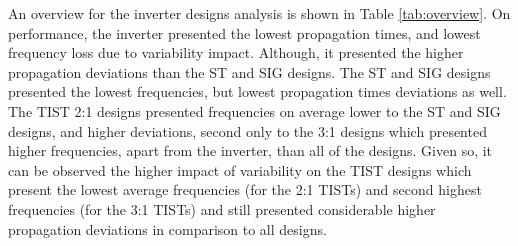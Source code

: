 \documentclass[pgmicro,mestrado,english]{iiufrgs}
\begin{document}
An overview for the inverter designs analysis is shown in Table \ref{tab:overview}. On performance, the inverter presented the lowest propagation times, and lowest frequency loss due to variability impact. Although, it presented the higher propagation deviations than the ST and SIG designs. The ST and SIG designs presented the lowest frequencies, but lowest propagation times deviations as well. The TIST 2:1 designs presented frequencies on average lower to the ST and SIG designs, and higher deviations, second only to the 3:1 designs which presented higher frequencies, apart from the inverter, than all of the designs. Given so, it can be observed the higher impact of variability on the TIST designs which present the lowest average frequencies (for the 2:1 TISTs) and second highest frequencies (for the 3:1 TISTs) and still presented considerable higher propagation deviations in comparison to all designs.
\end{document}
